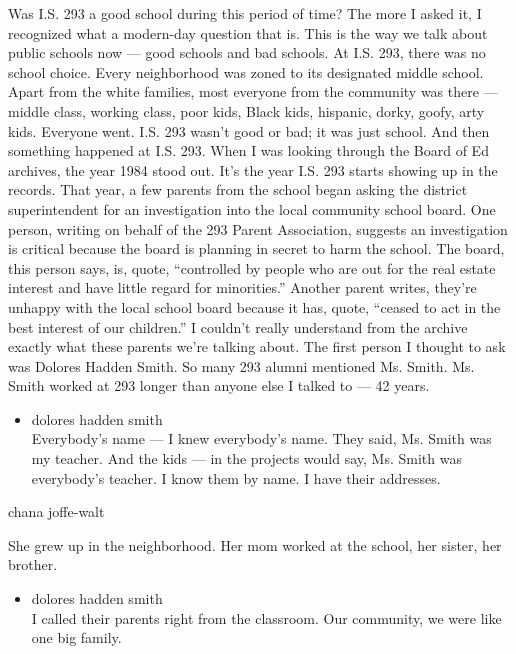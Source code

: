 Was I.S. 293 a good school during this period of time? The more I asked
it, I recognized what a modern-day question that is. This is the way we
talk about public schools now --- good schools and bad schools. At I.S.
293, there was no school choice. Every neighborhood was zoned to its
designated middle school. Apart from the white families, most everyone
from the community was there --- middle class, working class, poor kids,
Black kids, hispanic, dorky, goofy, arty kids. Everyone went. I.S. 293
wasn't good or bad; it was just school. And then something happened at
I.S. 293. When I was looking through the Board of Ed archives, the year
1984 stood out. It's the year I.S. 293 starts showing up in the records.
That year, a few parents from the school began asking the district
superintendent for an investigation into the local community school
board. One person, writing on behalf of the 293 Parent Association,
suggests an investigation is critical because the board is planning in
secret to harm the school. The board, this person says, is, quote,
``controlled by people who are out for the real estate interest and have
little regard for minorities.'' Another parent writes, they're unhappy
with the local school board because it has, quote, ``ceased to act in
the best interest of our children.'' I couldn't really understand from
the archive exactly what these parents we're talking about. The first
person I thought to ask was Dolores Hadden Smith. So many 293 alumni
mentioned Ms. Smith. Ms. Smith worked at 293 longer than anyone else I
talked to --- 42 years.

\begin{itemize}
\tightlist
\item
  dolores hadden smith\\
  Everybody's name --- I knew everybody's name. They said, Ms. Smith was
  my teacher. And the kids --- in the projects would say, Ms. Smith was
  everybody's teacher. I know them by name. I have their addresses.
\end{itemize}

chana joffe-walt

She grew up in the neighborhood. Her mom worked at the school, her
sister, her brother.

\begin{itemize}
\tightlist
\item
  dolores hadden smith\\
  I called their parents right from the classroom. Our community, we
  were like one big family.
\end{itemize}

